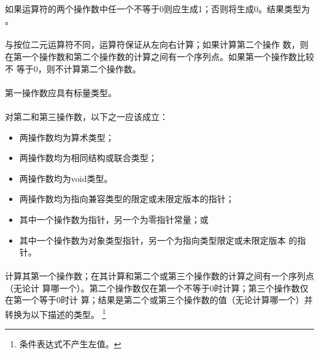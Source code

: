 {\semantic
\paragraph{}
如果\tm{||}运算符的两个操作数中任一个不等于0则应生成1；否则将生成0。结果类型为
。

\paragraph{}
与按位二元\tm{|}运算符不同，\tm{||}运算符保证从左向右计算；如果计算第二个操作
数，则在第一个操作数和第二个操作数的计算之间有一个序列点。如果第一个操作数比较不
等于0，则不计算第二个操作数。

\syntax
\paragraph{}

\constraint
\paragraph{}
第一操作数应具有标量类型。

\paragraph{}
对第二和第三操作数，以下之一应该成立：
\begin{itemize}
  \item{两操作数均为算术类型；}
  \item{两操作数均为相同结构或联合类型；}
  \item{两操作数均为void类型。}
  \item{两操作数均为指向兼容类型的限定或未限定版本的指针；}
  \item{其中一个操作数为指针，另一个为零指针常量；或}
  \item{其中一个操作数为对象类型指针，另一个为指向类型限定或未限定版本
    的指针。}
\end{itemize}

\semantic
\paragraph{}
计算其第一个操作数；在其计算和第二个或第三个操作数的计算之间有一个序列点（无论计
算哪一个）。第二个操作数仅在第一个不等于0时计算；第三个操作数仅在第一个等于0时计
算；结果是第二个或第三个操作数的值（无论计算哪一个）并转换为以下描述的类型。
\footnote{条件表达式不产生左值。}

}
